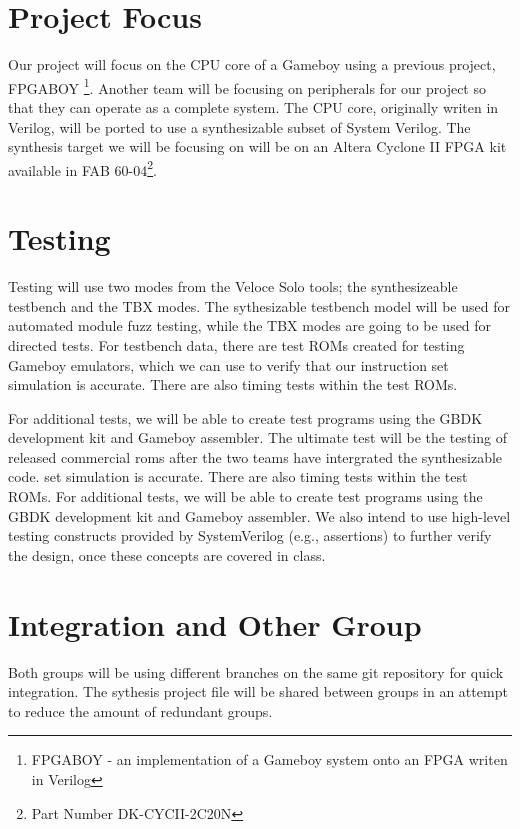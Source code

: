 
\section{Project Focus}
Our project will focus on the CPU core of a Gameboy using a previous project,
FPGABOY \footnote{FPGABOY - an implementation of a Gameboy system onto an FPGA 
writen in Verilog}. Another team will be focusing on peripherals for our project 
so that they can operate as a complete system. The CPU core, originally writen 
in Verilog, will be ported to use a synthesizable subset of System Verilog.
The synthesis target we will be focusing on will be on an Altera Cyclone II 
FPGA kit available in FAB 60-04\footnote{Part Number DK-CYCII-2C20N}.

\section{Testing}

Testing will use two modes from the Veloce Solo tools; the synthesizeable 
testbench and the TBX modes. The sythesizable testbench model will be used for 
automated module fuzz testing, while the TBX modes are going to be used for 
directed tests. For testbench data, there are test ROMs created 
for testing Gameboy emulators, which we can use to verify that our instruction 
set simulation is accurate. There are also timing tests within the test ROMs. 

For additional tests, we will be able to create test programs using the GBDK 
development kit and Gameboy assembler. The ultimate test will be the testing 
of released commercial roms after the two teams have intergrated the 
synthesizable code. set simulation is accurate. There are also timing tests 
within the test ROMs. For additional tests, we will be able to create test 
programs using the GBDK development kit and Gameboy assembler.
We also intend to use high-level testing constructs provided by SystemVerilog 
(e.g., assertions) to further verify the design, once these concepts are 
covered in class. 

\section{Integration and Other Group}
Both groups will be using different branches on the same git repository for 
quick integration. The sythesis project file will be shared between groups in 
an attempt to reduce the amount of redundant groups.
